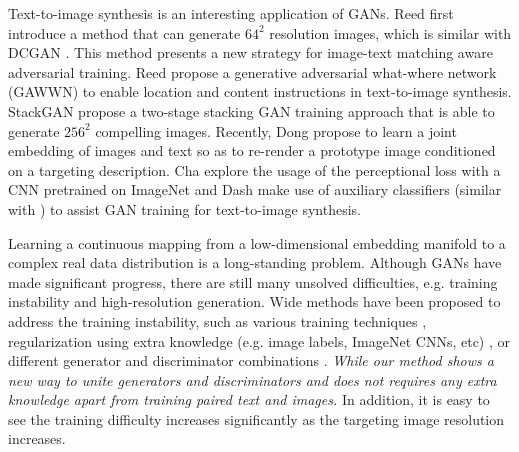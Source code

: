\documentclass[10pt,twocolumn,letterpaper]{article}
\begin{document}
Text-to-image synthesis is an interesting application of GANs. Reed \etal \cite{reed2016generative}  first introduce a method that can generate $64^2$ resolution images, which is similar with DCGAN \cite{radford2015unsupervised}. This method presents a new strategy for image-text matching aware adversarial training. Reed \etal \cite{reed2016learning} propose a generative
adversarial what-where network (GAWWN) to enable location and content instructions in text-to-image synthesis. StackGAN \etal \cite{han2017stackgan} propose a two-stage stacking GAN training approach that is able to generate $256^2$ compelling images. Recently, Dong \etal \cite{dong2017semantic} propose to learn a joint embedding of images and text so as to re-render a prototype image conditioned on a targeting description. Cha \etal \cite{char2017perceptual} explore the usage of the perceptional loss \cite{johnson2016perceptual} with a CNN pretrained on ImageNet  and Dash \etal \cite{dash2017tac} make use of auxiliary classifiers (similar with \cite{odena2016conditional}) to assist GAN training for text-to-image synthesis. 
	
Learning a continuous mapping from a low-dimensional embedding manifold to a complex real data distribution is a long-standing problem. Although GANs have made significant progress, there are still many unsolved difficulties, e.g. training instability and high-resolution generation. Wide methods have been proposed to address the training instability, such as various training techniques \cite{salimans2016improved,arjovsky2017wasserstein,berthelot2017began,shrivastava2016learning,odena2016conditional}, regularization using extra knowledge (e.g. image labels, ImageNet CNNs, etc) \cite{dosovitskiy2016generating,ledig2016photo,dash2017tac,dash2017tac}, or different generator and discriminator combinations  \cite{metz2016unrolled,durugkar2016generative,yang2017lr,huang2016stacked}. \textit{While our method shows a new way to unite generators and discriminators and does not requires any extra knowledge apart from training paired text and images.} In addition, it is easy to see the training difficulty increases significantly as the targeting image resolution increases.

\end{document}
